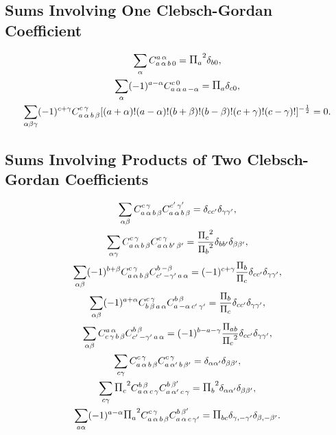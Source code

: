 \subsection{Sums Involving One Clebsch-Gordan Coefficient}\label{sec:8.7.1}
\begin{gather}
\sum_{\alpha} \clebsch{a}{\alpha}{b}{0}{a}{\alpha}=\Fact{a}^{2} \delta_{b 0}, \label{eq:8:7:1}\\
\sum_{\alpha}(-1)^{a-\alpha} \clebsch{a}{\alpha}{a}{-\alpha}{c}{0}=\Fact{a} \delta_{c 0}, \label{eq:8:7:2}\\
\sum_{\alpha \beta \gamma}(-1)^{c+\gamma} \clebsch{a}{\alpha}{b}{\beta}{c}{\gamma}[(a+\alpha)!(a-\alpha)!(b+\beta)!(b-\beta)!(c+\gamma)!(c-\gamma)!]^{-\frac{1}{2}}=0. \label{eq:8:7:3}
\end{gather}
\subsection{Sums Involving Products of Two Clebsch-Gordan Coefficients}\label{sec:8.7.2}
\begin{gather}
\sum_{\alpha \beta} \clebsch{a}{\alpha}{b}{\beta}{c}{\gamma} \clebsch{a}{\alpha}{b}{\beta}{c^{\prime}}{\gamma^{\prime}}=\delta_{c c^{\prime}} \delta_{\gamma \gamma^{\prime}}, \label{eq:8:7:4}\\
\sum_{\alpha \gamma} \clebsch{a}{\alpha}{b}{\beta}{c}{\gamma} \clebsch{a}{\alpha}{b^{\prime}}{\beta^{\prime}}{c}{\gamma}=\frac{\Fact{c}^{2}}{\Fact{b}^{2}} \delta_{b b^{\prime}} \delta_{\beta \beta^{\prime}}, \label{eq:8:7:5}\\
\sum_{\alpha \beta}(-1)^{b+\beta} \clebsch{a}{\alpha}{b}{\beta}{c}{\gamma} \clebsch{c^{\prime}}{-\gamma^{\prime}}{a}{\alpha}{b}{-\beta}=(-1)^{c+\gamma} \frac{\Fact{b}}{\Fact{c}} \delta_{c c^{\prime}} \delta_{\gamma \gamma^{\prime}}, \label{eq:8:7:6}\\
\sum_{\alpha \beta}(-1)^{a+\alpha} \clebsch{b}{\beta}{a}{\alpha}{c}{\gamma} \clebsch{a}{-\alpha}{c^{\prime}}{\gamma^{\prime}}{b}{\beta}=\frac{\Fact{b}}{\Fact{c}} \delta_{c c^{\prime}} \delta_{\gamma \gamma^{\prime}}, \label{eq:8:7:7}\\
\sum_{\alpha \beta} \clebsch{c}{\gamma}{b}{\beta}{a}{\alpha} \clebsch{c^{\prime}}{-\gamma^{\prime}}{a}{\alpha}{b}{\beta}=(-1)^{b-a-\gamma} \frac{\Fact{a b}}{\Fact{c}^{2}} \delta_{c c^{\prime}} \delta_{\gamma \gamma^{\prime}}, \label{eq:8:7:8}\\
\sum_{c \gamma} \clebsch{a}{\alpha}{b}{\beta}{c}{\gamma} \clebsch{a}{\alpha^{\prime}}{b}{\beta^{\prime}}{c}{\gamma}=\delta_{\alpha \alpha^{\prime}} \delta_{\beta \beta^{\prime}}, \label{eq:8:7:9}\\
\sum_{c \gamma} \Fact{c}^{2} \clebsch{a}{\alpha}{c}{\gamma}{b}{\beta} \clebsch{a}{\alpha^{\prime}}{c}{\gamma}{b}{\beta^{\prime}}=\Fact{b}^{2} \delta_{\alpha \alpha^{\prime}} \delta_{\beta \beta^{\prime}}, \label{eq:8:7:10}\\
\sum_{a \alpha}(-1)^{a-\alpha} \Fact{a}^{2} \clebsch{a}{\alpha}{b}{\beta}{c}{\gamma} \clebsch{a}{\alpha}{c}{\gamma^{\prime}}{b}{\beta^{\prime}}=\Fact{b c} \delta_{\gamma,-\gamma^{\prime}} \delta_{\beta,-\beta^{\prime}}. \label{eq:8:7:11}
\end{gather}

